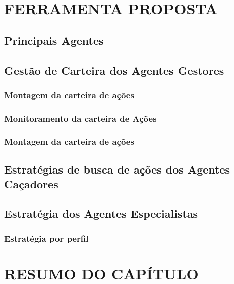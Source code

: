 \section{FERRAMENTA PROPOSTA}
\subsection{Principais Agentes}
\subsection{Gestão de Carteira dos Agentes Gestores}
\subsubsection{Montagem da carteira de ações}
\subsubsection{Monitoramento da carteira de Ações}
\subsubsection{Montagem da carteira de ações}
\subsection{Estratégias de busca de ações dos Agentes Caçadores}
\subsection{Estratégia dos Agentes Especialistas}
\subsubsection{Estratégia por perfil}


\section{RESUMO DO CAPÍTULO}







